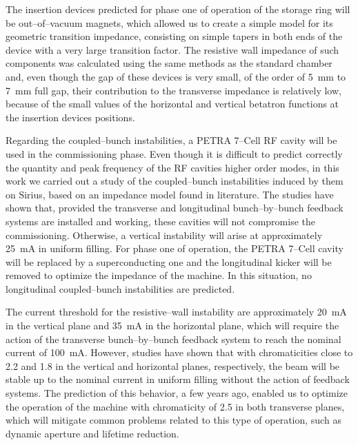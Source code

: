     The insertion devices predicted for phase one of operation of the storage ring will be out--of--vacuum magnets, which allowed us to create a simple model for its geometric transition impedance, consisting on simple tapers in both ends of the device with a very large transition factor. The resistive wall impedance of such components was calculated using the same methods as the standard chamber and, even though the gap of these devices is very small, of the order of \SI{5}{\milli\meter} to \SI{7}{\milli\meter} full gap, their contribution to the transverse impedance is relatively low, because of the small values of the horizontal and vertical betatron functions at the insertion devices positions.

    Regarding the coupled--bunch instabilities, a PETRA 7--Cell RF cavity will be used in the commissioning phase. Even though it is difficult to predict correctly the quantity and peak frequency of the RF cavities higher order modes, in this work we carried out a study of the coupled--bunch instabilities induced by them on Sirius, based on an impedance model found in literature. The studies have shown that, provided the transverse and longitudinal bunch--by--bunch feedback systems are installed and working, these cavities will not compromise the commissioning. Otherwise, a vertical instability will arise at approximately \SI{25}{\milli\ampere} in uniform filling. For phase one of operation, the PETRA 7--Cell cavity will be replaced by a superconducting one and the longitudinal kicker will be removed to optimize the impedance of the machine. In this situation, no longitudinal coupled--bunch instabilities are predicted.

    The current threshold for the resistive--wall instability are approximately \SI{20}{\milli\ampere} in the vertical plane and \SI{35}{\milli\ampere} in the horizontal plane, which will require the action of the transverse bunch--by--bunch feedback system to reach the nominal current of \SI{100}{\milli\ampere}. However, studies have shown that with chromaticities close to \num{2.2} and \num{1.8} in the vertical and horizontal planes, respectively, the beam will be stable up to the nominal current in uniform filling without the action of feedback systems. The prediction of this behavior, a few years ago, enabled us to optimize the operation of the machine with chromaticity of \num{2.5} in both transverse planes, which will mitigate common problems related to this type of operation, such as dynamic aperture and lifetime reduction.

